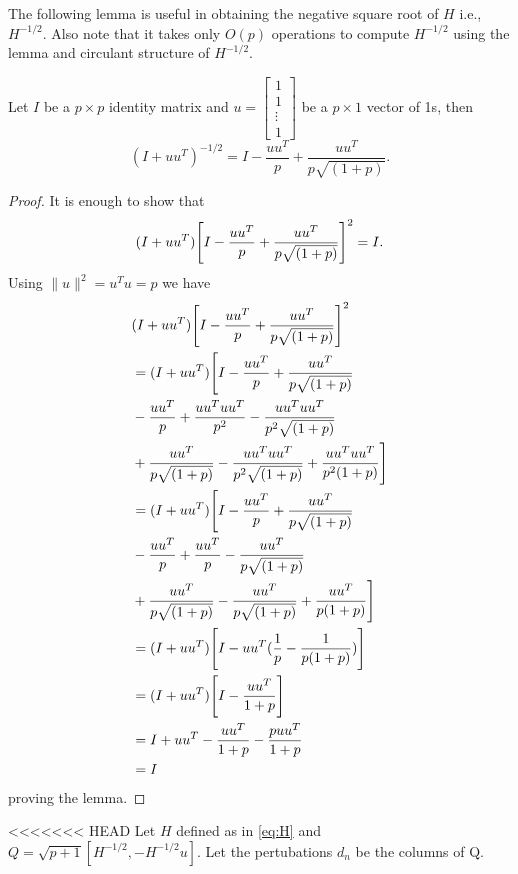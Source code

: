 The following lemma is useful in obtaining the negative square root of $H$ i.e., 
$H^{-1/2}$. Also note that it takes only $O(p)$ operations to compute $H^{-1/2}$
using the lemma and circulant structure of $H^{-1/2}$.
\begin{lemma}
 \label{lemma: gen Sherman-Morisson}
Let $I$ be a $p \times p$ identity matrix and $u = 
\left[
 \begin{array}{cccc}
 1 \\ 1 \\  \vdots \\ 1 
\end{array} \right]$ be a $p \times 1$ vector of 1s, then
$$ (I+uu^T)^{-1/2}= I-\frac{uu^T}{p}+\frac{uu^T}{p\sqrt{(1+p)}}.$$
\end{lemma}
\begin{proof}
It is enough to show that
$$(I+uu^T)\Bigg{[}I-\frac{uu^T}{p}+\frac{uu^T}{p\sqrt{(1+p)}}\Bigg{]}^2=I.$$
Using $\|u\|^2=u^Tu=p$ we have
\begin{align*}
 & (I+uu^T)\Bigg{[}I-\frac{uu^T}{p}+\frac{uu^T}{p\sqrt{(1+p)}}\Bigg{]}^2\\
 &= (I+uu^T)\Bigg{[}I-\frac{uu^T}{p}+\frac{uu^T}{p\sqrt{(1+p)}}\\
 &-\frac{uu^T}{p}+\frac{uu^Tuu^T}{p^2}-\frac{uu^Tuu^T}{p^2\sqrt{(1+p)}}\\
 &+\frac{uu^T}{p\sqrt{(1+p)}}-\frac{uu^Tuu^T}{p^2\sqrt{(1+p)}}+\frac{uu^Tuu^T}{p^2(1+p)}\Bigg{]}\\
 &= (I+uu^T)\Bigg{[}I-\frac{uu^T}{p}+\frac{uu^T}{p\sqrt{(1+p)}}\\
 &-\frac{uu^T}{p}+\frac{uu^T}{p}-\frac{uu^T}{p\sqrt{(1+p)}}\\
 &+\frac{uu^T}{p\sqrt{(1+p)}}-\frac{uu^T}{p\sqrt{(1+p)}}+\frac{uu^T}{p(1+p)}\Bigg{]}\\
 &=(I+uu^T)\Bigg{[}I-uu^T(\frac{1}{p}-\frac{1}{p(1+p)})\Bigg{]}\\
 &=(I+uu^T)\Bigg{[}I-\frac{uu^T}{1+p}\Bigg{]}\\
 &=I+uu^T-\frac{uu^T}{1+p}-\frac{puu^T}{1+p}\\
 &=I
\end{align*}
proving the lemma.
\end{proof}
<<<<<<< HEAD
Let $H$ defined as in \eqref{eq:H} and $Q=\sqrt{p+1}[H^{-1/2},-H^{-1/2}u].$
Let the pertubations $d_n$ be the columns of Q. 
